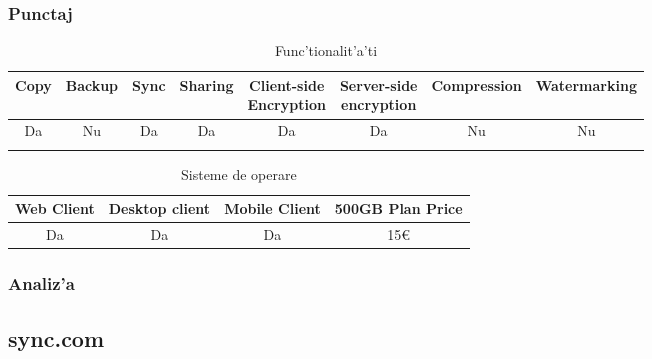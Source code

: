 \documentclass[12pt,a4paper,twoside]{report}
\newcommand{\greencheck}{\color{green}  \ding{51}}
\newcommand{\redxmark}{\color{red} \ding{55}}
\begin{document}
\subsubsection{Punctaj}
\begin{table}[H]
\centering
\caption{Func'tionalit'a'ti}
\begin{tabular}{|c|c|c|c|c|c|c|c|}          
\hline               
Copy & Backup & Sync & Sharing & \makecell{Client-side\\ Encryption} & \makecell{Server-side \\ encryption} & Compression & Watermarking \\ [0.5ex]   
\hline 
Da & Nu & Da & Da & Da & Da & Nu & Nu    \\                      
\greencheck & \redxmark\redxmark & \greencheck & \greencheck & \greencheck\greencheck & \greencheck\greencheck &  \redxmark\redxmark &  \redxmark\redxmark  \\               
\hline                              
\end{tabular}
\label{table:pcloudfeaturetable}             
\end{table}
\begin{table}[H]
\centering
\caption{Sisteme de operare}
\begin{tabular}{|c|c|c|c|}          
\hline                      
 Web Client & Desktop client & Mobile Client & 500GB Plan Price\\ [0.5ex]   
\hline                            
Da & Da & Da & 15\euro \\               
\hline                              
\end{tabular}
\label{table:pcloudsystemtable}             
\end{table}
\subsubsection{Analiz'a}

\subsection{sync.com}
\end{document}

